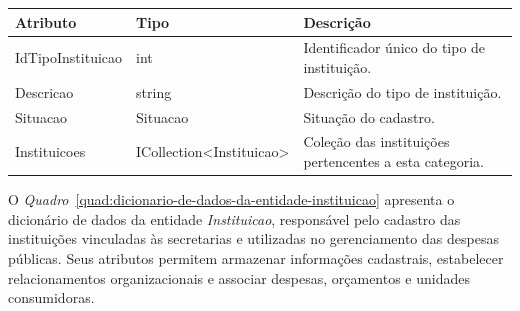 \begin{quadro}[H]
\caption[Dicionário de dados da entidade TipoInstituicao]{Dicionário de dados da entidade TipoInstituicao}
\label{quad:dicionario-de-dados-da-entidade-tipoinstituicao}

\begin{tabular}{|p{}|p{}|p{}|}
\hline
\textbf{Atributo} & \textbf{Tipo} & \textbf{Descrição} \\ 
\hline
IdTipoInstituicao & int & Identificador único do tipo de instituição. \\ 
\hline
Descricao & string & Descrição do tipo de instituição. \\ 
\hline
Situacao & Situacao & Situação do cadastro. \\ 
\hline
Instituicoes & ICollection<Instituicao> & Coleção das instituições pertencentes a esta categoria. \\ 
\hline
\end{tabular}


\end{quadro}


O \textit{Quadro}~\ref{quad:dicionario-de-dados-da-entidade-instituicao} apresenta o dicionário de dados da entidade \textit{Instituicao}, responsável pelo cadastro das instituições vinculadas às secretarias e utilizadas no gerenciamento das despesas públicas. Seus atributos permitem armazenar informações cadastrais, estabelecer relacionamentos organizacionais e associar despesas, orçamentos e unidades consumidoras.

